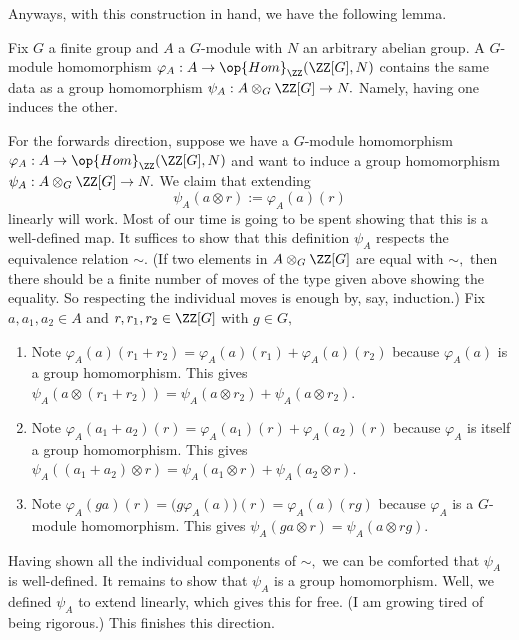 Anyways, with this construction in hand, we have the following lemma.
\begin{lemma}
    Fix $G$ a finite group and $A$ a $G$-module with $N$ an arbitrary abelian group. A $G$-module homomorphism $\varphi_A:A\to\op{Hom}_\ZZ(\ZZ[G],N)$ contains the same data as a group homomorphism $\psi_A:A\otimes_G\ZZ[G]\to N.$ Namely, having one induces the other.
\end{lemma}
For the forwards direction, suppose we have a $G$-module homomorphism $\varphi_A:A\to\op{Hom}_\ZZ(\ZZ[G],N)$ and want to induce a group homomorphism $\psi_A:A\otimes_G\ZZ[G]\to N.$ We claim that extending
\[\psi_A(a\otimes r):=\varphi_A(a)(r)\]
linearly will work. Most of our time is going to be spent showing that this is a well-defined map. It suffices to show that this definition $\psi_A$ respects the equivalence relation $\sim.$ (If two elements in $A\otimes_G\ZZ[G]$ are equal with $\sim,$ then there should be a finite number of moves of the type given above showing the equality. So respecting the individual moves is enough by, say, induction.) Fix $a,a_1,a_2\in A$ and $r,r_1,r_2\in\ZZ[G]$ with $g\in G,$
\begin{enumerate}[label=(\alph*)]
    \item Note $\varphi_A(a)(r_1+r_2)=\varphi_A(a)(r_1)+\varphi_A(a)(r_2)$ because $\varphi_A(a)$ is a group homomorphism. This gives $\psi_A(a\otimes(r_1+r_2))=\psi_A(a\otimes r_2)+\psi_A(a\otimes r_2).$
    \item Note $\varphi_A(a_1+a_2)(r)=\varphi_A(a_1)(r)+\varphi_A(a_2)(r)$ because $\varphi_A$ is itself a group homomorphism. This gives $\psi_A((a_1+a_2)\otimes r)=\psi_A(a_1\otimes r)+\psi_A(a_2\otimes r).$
    \item Note $\varphi_A(ga)(r)=\big(g\varphi_A(a)\big)(r)=\varphi_A(a)(rg)$ because $\varphi_A$ is a $G$-module homomorphism. This gives $\psi_A(ga\otimes r)=\psi_A(a\otimes rg).$
\end{enumerate}
Having shown all the individual components of $\sim,$ we can be comforted that $\psi_A$ is well-defined. It remains to show that $\psi_A$ is a group homomorphism. Well, we defined $\psi_A$ to extend linearly, which gives this for free. (I am growing tired of being rigorous.) This finishes this direction.

